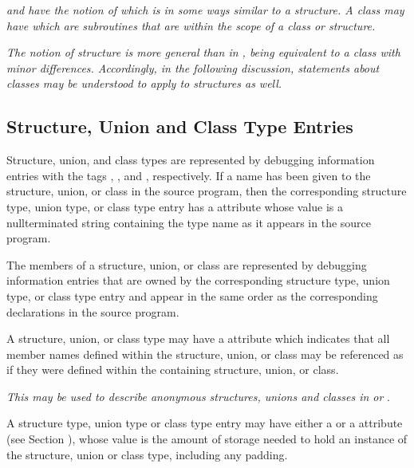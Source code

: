 \textit{ and 
 have the notion of  which is in some
ways similar to a structure. A class may have  which are subroutines that are within the scope
of a class or structure.}

\textit{The  notion of 
structure is more general than in , being
equivalent to a class with minor differences. Accordingly,
in the following discussion, statements about 
 classes may
be understood to apply to  structures as well.}

\subsection{Structure, Union and Class Type Entries}
\label{chap:structureunionandclasstypeentries}
Structure, union, and class types are represented by debugging
information entries 
with 
the tags 
\DWTAGstructuretypeTARG,
\DWTAGuniontypeTARG, 
and \DWTAGclasstypeTARG,
respectively. If a name has been given to the structure,
union, or class in the source program, then the corresponding
structure type, union type, or class type entry has a
\DWATname{} attribute 
whose value is a null\dash terminated string
containing the type name as it appears in the source program.

The members of a structure, union, or class are represented
by debugging information entries that are owned by the
corresponding structure type, union type, or class type entry
and appear in the same order as the corresponding declarations
in the source program.

A structure, union, or class type may have a \DWATexportsymbolsNAME{}
attribute 
which indicates that all member names defined within 
the structure, union, or class may be referenced as if they were
defined within the containing structure, union, or class. 

\textit{This may be used to describe anonymous structures, unions 
and classes in  or }.

A structure type, union type or class type entry may have
either a \DWATbytesize{} or a
\DWATbitsize{} attribute 
\hypertarget{chap:DWATbitsizedatamemberbitsize}{}
(see Section ), 
whose value is the amount of storage needed
to hold an instance of the structure, union or class type,
including any padding.
  
